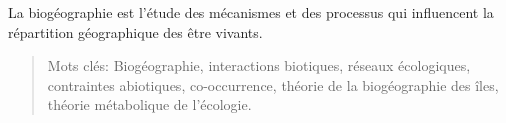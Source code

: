 La biogéographie est l'étude des mécanismes et des processus qui
influencent la répartition géographique des être vivants.

\begin{quote}
Mots clés: Biogéographie, interactions biotiques, réseaux écologiques,
contraintes abiotiques, co-occurrence, théorie de la biogéographie des
îles, théorie métabolique de l'écologie.
\end{quote}
